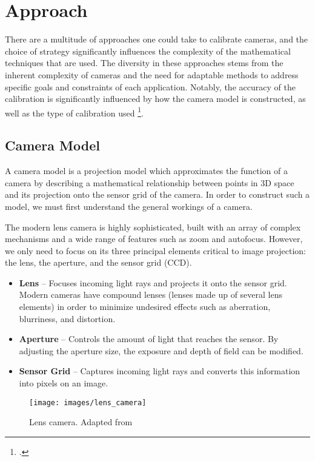 \section{Approach} 

There are a multitude of approaches one could take to calibrate cameras, and the choice of strategy significantly influences the complexity of the mathematical techniques that are used. The diversity in these approaches stems from the inherent complexity of cameras and the need for adaptable methods to address specific goals and constraints of each application. Notably, the accuracy of the calibration is significantly influenced by how the camera model is constructed, as well as the type of calibration used \footcite{weisunRequirementsCamera2005}.

\subsection{Camera Model} \label{sec:camera_model}

A camera model is a projection model which approximates the function of a camera by describing a mathematical relationship between points in 3D space and its projection onto the sensor grid of the camera. In order to construct such a model, we must first understand the general workings of a camera.

The modern lens camera is highly sophisticated, built with an array of complex mechanisms and a wide range of features such as zoom and autofocus. However, we only need to focus on its three principal elements critical to image projection: the lens, the aperture, and the sensor grid (CCD). 

\begin{itemize}[leftmargin=!, itemindent=-5ex]
    \item \textbf{Lens} -- Focuses incoming light rays and projects it onto the sensor grid. Modern cameras have compound lenses (lenses made up of several lens elements) in order to minimize undesired effects such as aberration, blurriness, and distortion. 
    \item \textbf{Aperture} -- Controls the amount of light that reaches the sensor. By adjusting the aperture size, the exposure and depth of field can be modified.
    \item \textbf{Sensor Grid} -- Captures incoming light rays and converts this information into pixels on an image. 
\end{itemize}

\begin{figure}[H]
    \centering
    \texttt{[image: images/lens\_camera]}
    \caption{Lens camera. Adapted from \cite{coltonPhysics1232012}} \label{fig:lens_camera}
\end{figure}

